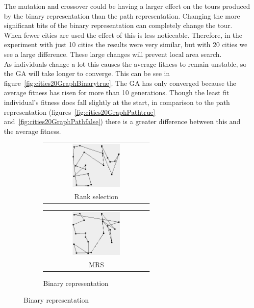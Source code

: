 \documentclass[10pt,a4paper,openbib]{article}
\makeatletter
\newcommand{\subsubfloat}[2]{%
  \begin{tabular}{@{}c@{}}#1\\#2\end{tabular}%
}
\makeatother
\begin{document}
\begin{multicols}{2}
\noindent The mutation and crossover could be having a larger effect on the tours produced by the binary representation than the path representation. Changing the more significant bits of the binary representation can completely change the tour. When fewer cities are used the effect of this is less noticeable. Therefore, in the experiment with just 10 cities the results were very similar, but with 20 cities we see a large difference. These large changes will prevent local area search. \\


\noindent As individuals change a lot this causes the average fitness to remain unstable, so the GA will take longer to converge. This can be see in figure~\ref{fig:cities20GraphBinarytrue}. The GA has only converged because the average fitness has risen for more than 10 generations. Though the least fit individual's fitness does fall slightly at the start, in comparison to the path representation (figures~\ref{fig:cities20GraphPathtrue} and~\ref{fig:cities20GraphPathfalse}) there is a greater difference between this and the average fitness.\\



\begin{figure}[H]
\begin{center}
    \begin{subfigure}[b]{0.24\textwidth}
    \begin{minipage}{\textwidth}\footnotesize

  		\subsubfloat{\includegraphics[width=0.48\textwidth]{images/result4/Binaryfalse0.png}}{Rank selection}\label{fig:cities20toursBR}
  		\subsubfloat{\includegraphics[width=0.48\textwidth]{images/result4/Binarytrue2.png}}{MRS}\label{fig:cities20toursOM}
 	\caption{Binary representation}\label{fig:cities20toursB}
  \end{minipage}
        

\end{subfigure}
\end{center}
\end{figure}
\end{multicols}
\end{document}
